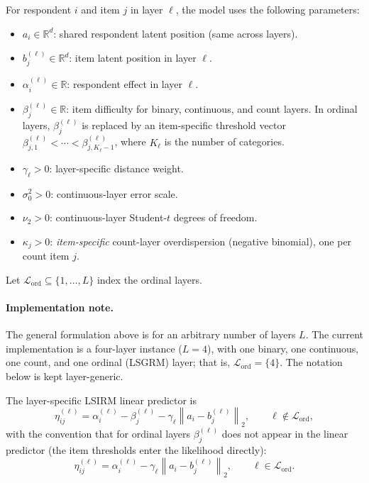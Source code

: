 \documentclass[11pt]{article}
\newcommand{\R}{\mathbb R}
\newcommand{\norm}[1]{\left\lVert #1 \right\rVert}
\begin{document}
For respondent $i$ and item $j$ in layer $\ell$, the model uses the following
parameters:
\begin{itemize}[leftmargin=1.5em]
    \item $a_i\in\R^d$: shared respondent latent position (same across layers).
    \item $b_j^{(\ell)}\in\R^d$: item latent position in layer $\ell$.
    \item $\alpha_i^{(\ell)}\in\R$: respondent effect in layer $\ell$.
    \item $\beta_j^{(\ell)}\in\R$: item difficulty for binary, continuous, and
    count layers.  In ordinal layers, $\beta_j^{(\ell)}$ is replaced by an
    item-specific threshold vector
    $\beta_{j,1}^{(\ell)}<\cdots<\beta_{j,K_\ell-1}^{(\ell)}$, where $K_\ell$
    is the number of categories.
    \item $\gamma_\ell>0$: layer-specific distance weight.
    \item $\sigma_0^2>0$: continuous-layer error scale.
    \item $\nu_2>0$: continuous-layer Student-$t$ degrees of freedom.
    \item $\kappa_j>0$: \emph{item-specific} count-layer overdispersion
    (negative binomial), one per count item $j$.
\end{itemize}
Let $\mathcal L_{\mathrm{ord}}\subseteq\{1,\dots,L\}$ index the ordinal
layers.

\paragraph{Implementation note.}
The general formulation above is for an arbitrary number of layers $L$.  The
current implementation is a four-layer instance ($L=4$), with one binary, one
continuous, one count, and one ordinal (LSGRM) layer; that is,
$\mathcal L_{\mathrm{ord}}=\{4\}$.  The notation below is kept layer-generic.

The layer-specific LSIRM linear predictor is
\begin{equation}
    \eta_{ij}^{(\ell)}
    =
    \alpha_i^{(\ell)}-\beta_j^{(\ell)}-\gamma_\ell\norm{a_i-b_j^{(\ell)}}_2,
    \qquad \ell\notin\mathcal L_{\mathrm{ord}},
    \label{eq:lsirm-linear-predictor}
\end{equation}
with the convention that for ordinal layers $\beta_j^{(\ell)}$ does not appear
in the linear predictor (the item thresholds enter the likelihood directly):
\begin{equation}
    \eta_{ij}^{(\ell)}
    =
    \alpha_i^{(\ell)}-\gamma_\ell\norm{a_i-b_j^{(\ell)}}_2,
    \qquad \ell\in\mathcal L_{\mathrm{ord}}.
    \label{eq:lsirm-linear-predictor-ord}
\end{equation}
\end{document}
